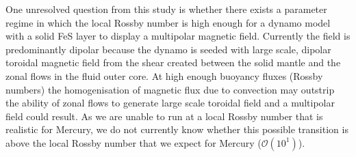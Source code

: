 One unresolved question from this study is whether there exists a parameter regime in which the local Rossby number is high enough for a dynamo model with a solid FeS layer to display a multipolar magnetic field. Currently the field is predominantly dipolar because the dynamo is seeded with large scale, dipolar toroidal magnetic field from the shear created between the solid mantle and the zonal flows in the fluid outer core. At high enough buoyancy fluxes (Rossby numbers) the homogenisation of magnetic flux due to convection may outstrip the ability of zonal flows to generate large scale toroidal field and a multipolar field could result. As we are unable to run at a local Rossby number that is realistic for Mercury, we do not currently know whether this possible transition is above the local Rossby number that we expect for Mercury ($\mathcal{O}\left(10^1\right)$).
%
%
%
%

